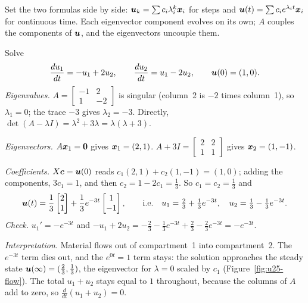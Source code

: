 Set the two formulas side by side: $\boldsymbol{u}_k=\sum c_i\lambda_i^{k}\boldsymbol{x}_i$ for steps and
$\boldsymbol{u}(t)=\sum c_ie^{\lambda_it}\boldsymbol{x}_i$ for continuous time. Each eigenvector component
evolves on its own; $A$ couples the components of $\boldsymbol{u}$, and the eigenvectors uncouple
them.

\begin{example}\label{ex:u25-flow}
Solve
\[
  \frac{du_1}{dt}=-u_1+2u_2,\qquad \frac{du_2}{dt}=u_1-2u_2,\qquad \boldsymbol{u}(0)=(1,0).
\]
\emph{Eigenvalues.} $A=\left[\begin{smallmatrix} -1&2\\ 1&-2\end{smallmatrix}\right]$ is
singular (column~2 is $-2$ times column~1), so $\lambda_1=0$; the trace $-3$ gives
$\lambda_2=-3$. Directly, $\det(A-\lambda I)=\lambda^{2}+3\lambda=\lambda(\lambda+3)$.

\emph{Eigenvectors.} $A\boldsymbol{x}_1=\boldsymbol{0}$ gives $\boldsymbol{x}_1=(2,1)$.
$A+3I=\left[\begin{smallmatrix} 2&2\\ 1&1\end{smallmatrix}\right]$ gives $\boldsymbol{x}_2=(1,-1)$.

\emph{Coefficients.} $X\boldsymbol{c}=\boldsymbol{u}(0)$ reads $c_1(2,1)+c_2(1,-1)=(1,0)$; adding the
components, $3c_1=1$, and then $c_2=1-2c_1=\tfrac13$. So $c_1=c_2=\tfrac13$ and
\[
  \boldsymbol{u}(t)=\frac13\begin{bmatrix} 2\\ 1\end{bmatrix}+\frac13e^{-3t}\begin{bmatrix} 1\\ -1\end{bmatrix},
  \qquad\text{i.e.}\quad u_1=\tfrac23+\tfrac13e^{-3t},\quad u_2=\tfrac13-\tfrac13e^{-3t}.
\]
\emph{Check.} $u_1'=-e^{-3t}$ and $-u_1+2u_2=-\tfrac23-\tfrac13e^{-3t}+\tfrac23-\tfrac23e^{-3t}=-e^{-3t}$.

\emph{Interpretation.} Material flows out of compartment~1 into compartment~2. The
$e^{-3t}$ term dies out, and the $e^{0t}=1$ term stays: the solution approaches the steady
state $\boldsymbol{u}(\infty)=(\tfrac23,\tfrac13)$, the eigenvector for $\lambda=0$ scaled by $c_1$
(Figure~\ref{fig:u25-flow}). The total $u_1+u_2$ stays equal to $1$ throughout, because the
columns of $A$ add to zero, so $\frac{d}{dt}(u_1+u_2)=0$.
\end{example}

